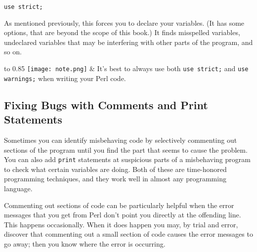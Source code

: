 \begin{lstlisting}
use strict;
\end{lstlisting}

As mentioned previously, this forces you to declare your variables. (It has some options, that are beyond the scope of this book.) It finds misspelled variables, undeclared variables that may be interfering with other parts of the program, and so on. 


\vspace{-5pt}
\begin{table}[h]
  \begin{center}
    \begin{tabu*} to 0.85\linewidth {|X[1,r,m]X[15,l,m]|}
      \tabucline{-}
      \texttt{[image: note.png]} & It's best to always use both \verb|use strict;| and \verb|use warnings;| when writing your Perl code.\\
      \tabucline{-}
    \end{tabu*}
  \end{center}
\end{table}
\vspace{-20pt}

\subsection{Fixing Bugs with Comments and Print Statements}
Sometimes you can identify misbehaving code by selectively commenting out sections of the program until you find the part that seems to cause the problem. You can also add \verb|print| statements at suspicious parts of a misbehaving program to check what certain variables are doing. Both of these are time-honored programming techniques, and they work well in almost any programming language.

Commenting out sections of code can be particularly helpful when the error messages that you get from Perl don't point you directly at the offending line. This happens occasionally. When it does happen you may, by trial and error, discover that commenting out a small section of code causes the error messages to go away; then you know where the error is occurring.

